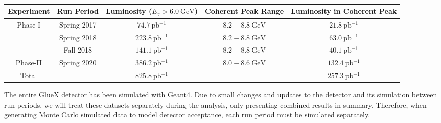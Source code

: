 \begin{table}
  \begin{center}
    \begin{tabular}{ccccc}\toprule
      Experiment & Run Period & Luminosity ($E_\gamma > \SI{6.0}{\giga\eV}$) & Coherent Peak Range & Luminosity in Coherent Peak \\\midrule
      Phase-I & Spring 2017 & $\SI{74.7}{\pico\barn^{-1}}$ & $8.2-\SI{8.8}{\giga\eV}$ & $\SI{21.8}{\pico\barn^{-1}}$ \\
              & Spring 2018 & $\SI{223.8}{\pico\barn^{-1}}$ & $8.2-\SI{8.8}{\giga\eV}$ & $\SI{63.0}{\pico\barn^{-1}}$ \\
              & Fall 2018 & $\SI{141.1}{\pico\barn^{-1}}$ & $8.2-\SI{8.8}{\giga\eV}$ & $\SI{40.1}{\pico\barn^{-1}}$ \\\midrule
      Phase-II & Spring 2020 & $\SI{386.2}{\pico\barn^{-1}}$ & $8.0-\SI{8.6}{\giga\eV}$ & $\SI{132.4}{\pico\barn^{-1}}$ \\\midrule
      Total & & $\SI{825.8}{\pico\barn^{-1}}$ & & $\SI{257.3}{\pico\barn^{-1}}$ \\\bottomrule
    \end{tabular}
    \caption{}\label{tab:run-info}
  \end{center}
\end{table}

The entire GlueX detector has been simulated with Geant4. Due to small changes and updates to the detector and its simulation between run periods, we will treat these datasets separately during the analysis, only presenting combined results in summary. Therefore, when generating Monte Carlo simulated data to model detector acceptance, each run period must be simulated separately.
